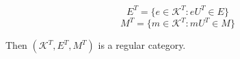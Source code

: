 $$E^T = \{e \in \mathcal{K}^T: eU^T \in E\}$$
$$M^T = \{m \in \mathcal{K}^T: mU^T \in M\}$$

Then $(\mathcal{K}^T, E^T, M^T)$ is a regular category.